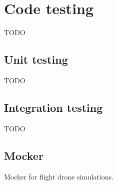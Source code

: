 \chapter{Code testing}
TODO

\section{Unit testing}
TODO

\section{Integration testing}
TODO

\section{Mocker}
Mocker for flight drone simulations.